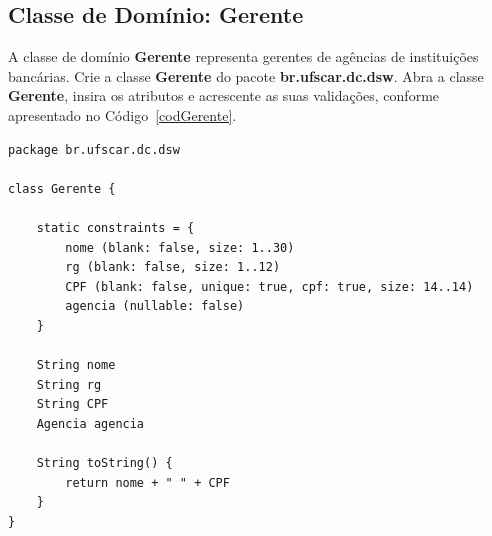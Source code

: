 \newpage

\subsection{Classe de Domínio: Gerente}\label{secGerente}

\vspace{0.5cm}

A  classe  de   domínio  {\bf  Gerente}  representa  gerentes   de  agências  de
instituições   bancárias.  Crie   a  classe   {\bf  Gerente}   do   pacote  {\bf
  br.ufscar.dc.dsw}.   Abra  a  classe  {\bf  Gerente}, insira  os  atributos  e
acrescente as suas validações, conforme apresentado no Código~\ref{codGerente}.  

\begin{lstlisting}[caption=Classe  de  domínio  {\bf  Gerente},  frame  =  trBL,
    float=htbp, label=codGerente] 
package br.ufscar.dc.dsw

class Gerente {

    static constraints = {
        nome (blank: false, size: 1..30)
        rg (blank: false, size: 1..12)
        CPF (blank: false, unique: true, cpf: true, size: 14..14)
        agencia (nullable: false)
    }

    String nome
    String rg
    String CPF
    Agencia agencia
    
    String toString() {
        return nome + " " + CPF
    }
}
\end{lstlisting}

\hspace{1cm}\\
\hspace{1cm}\\

